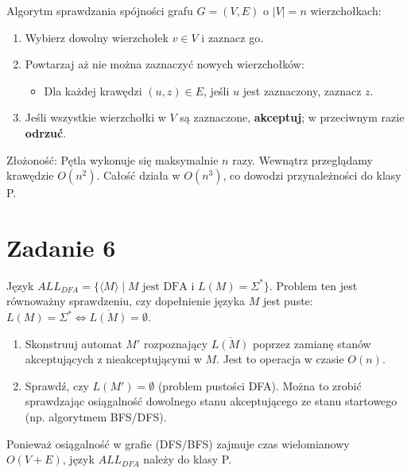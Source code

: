\documentclass{article}
\begin{document}
Algorytm sprawdzania spójności grafu $G = (V, E)$ o $|V|=n$ wierzchołkach:
\begin{enumerate}
    \item Wybierz dowolny wierzchołek $v \in V$ i zaznacz go.
    \item Powtarzaj aż nie można zaznaczyć nowych wierzchołków:
    \begin{itemize}
        \item Dla każdej krawędzi $(u, z) \in E$, jeśli $u$ jest zaznaczony, zaznacz $z$.
    \end{itemize}
    \item Jeśli wszystkie wierzchołki w $V$ są zaznaczone, \textbf{akceptuj}; w przeciwnym razie \textbf{odrzuć}.
\end{enumerate}
Złożoność: Pętla wykonuje się maksymalnie $n$ razy. Wewnątrz przeglądamy krawędzie $O(n^2)$. Całość działa w $O(n^3)$, co dowodzi przynależności do klasy P.


\section{Zadanie 6}

Język $ALL_{DFA} = \{ \langle M \rangle \mid M \text{ jest DFA i } L(M) = \Sigma^* \}$.
Problem ten jest równoważny sprawdzeniu, czy dopełnienie języka $M$ jest puste: $L(M) = \Sigma^* \iff \overline{L(M)} = \emptyset$.
\begin{enumerate}
    \item Skonstruuj automat $M'$ rozpoznający $\overline{L(M)}$ poprzez zamianę stanów akceptujących z nieakceptującymi w $M$. Jest to operacja w czasie $O(n)$.
    \item Sprawdź, czy $L(M') = \emptyset$ (problem pustości DFA). Można to zrobić sprawdzając osiągalność dowolnego stanu akceptującego ze stanu startowego (np. algorytmem BFS/DFS).
\end{enumerate}
Ponieważ osiągalność w grafie (DFS/BFS) zajmuje czas wielomianowy $O(V+E)$, język $ALL_{DFA}$ należy do klasy P.
\end{document}
